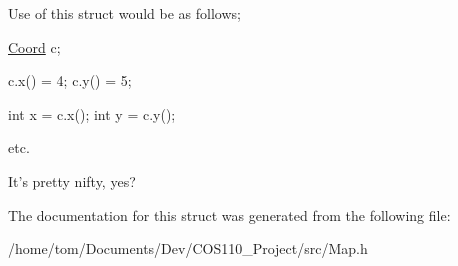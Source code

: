 Use of this struct would be as follows;

\hyperlink{structCoord}{Coord} c;

c.\-x() = 4; c.\-y() = 5;

int x = c.\-x(); int y = c.\-y();

etc.

It's pretty nifty, yes? 

The documentation for this struct was generated from the following file\-:\begin{DoxyCompactItemize}
\item 
/home/tom/\-Documents/\-Dev/\-C\-O\-S110\-\_\-\-Project/src/Map.\-h\end{DoxyCompactItemize}
